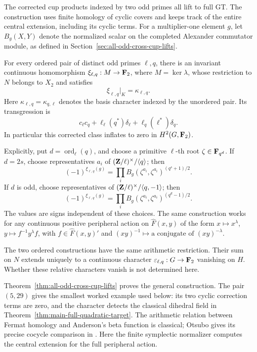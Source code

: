 The corrected cup products indexed by two odd primes all lift to full
GT. The construction uses finite homology of cyclic covers and keeps
track of the entire central extension, including its cyclic terms.
For a multiplier-one element \(g\), let \(B_g(X,Y)\) denote the
normalized scalar on the completed Alexander commutator module,
as defined in Section~\ref{sec:all-odd-cross-cup-lifts}.

\begin{theorem}\label{thm:main-odd-pair-lifts}
For every ordered pair of distinct odd primes \(\ell,q\), there is
an invariant continuous homomorphism \(\xi_{\ell,q}:M\to\mathbf F_2\),
where \(M=\ker\lambda\), whose restriction to \(N\) belongs to
\(X_2\) and satisfies
\[
                    \xi_{\ell,q}|_K=\kappa_{\ell,q}.
\]
Here \(\kappa_{\ell,q}=\kappa_{q,\ell}\) denotes the basis
character indexed by the unordered pair. Its transgression is
\[
 c_\ell c_q+\ell_\ell(q^*)\delta_\ell
                         +\ell_q(\ell^*)\delta_q.
\]
In particular this corrected class inflates to zero in
\(H^2(G,\mathbf F_2)\).

Explicitly, put \(d=\operatorname{ord}_\ell(q)\), and choose a
primitive \(\ell\)-th root \(\zeta\in\mathbf F_{q^d}\).
If \(d=2s\), choose representatives \(a_i\) of
\((\mathbf Z/\ell)^\times/\langle q\rangle\); then
\[
 (-1)^{\xi_{\ell,q}(g)}
   =\prod_i B_g(\zeta^{a_i},\zeta^{a_i})^{(q^s+1)/2}.
\]
If \(d\) is odd, choose representatives of
\((\mathbf Z/\ell)^\times/\langle q,-1\rangle\); then
\[
 (-1)^{\xi_{\ell,q}(g)}
   =\prod_i B_g(\zeta^{a_i},\zeta^{a_i})^{(q^d-1)/2}.
\]
The values are signs independent of these choices.
The same construction works for any continuous positive peripheral
action on \(\widehat F(x,y)\) of the form
\(x\mapsto x^\lambda\), \(y\mapsto f^{-1}y^\lambda f\),
with \(f\in\widehat F(x,y)'\) and
\((xy)^{-1}\mapsto\text{a conjugate of }(xy)^{-\lambda}\).

The two ordered constructions have the same arithmetic restriction.
Their sum on \(N\) extends uniquely to a continuous character
\(\varepsilon_{\ell,q}:G\to\mathbf F_2\) vanishing on \(H\).
Whether these relative characters vanish is not determined here.
\end{theorem}

Theorem~\ref{thm:all-odd-cross-cup-lifts} proves the general
construction. The pair \((5,29)\) gives the smallest worked example
used below: its two cyclic correction terms are zero, and the
character detects the classical dihedral field in
Theorem~\ref{thm:main-full-quadratic-target}.
The arithmetic relation between Fermat homology and Anderson's beta
function is classical; Otsubo gives its precise cocycle comparison
in \cite[\S7, p.~637, (7.1)--(7.2)]{Otsubo2016}.
Here the finite symplectic normalizer computes the central extension
for the full peripheral action.
